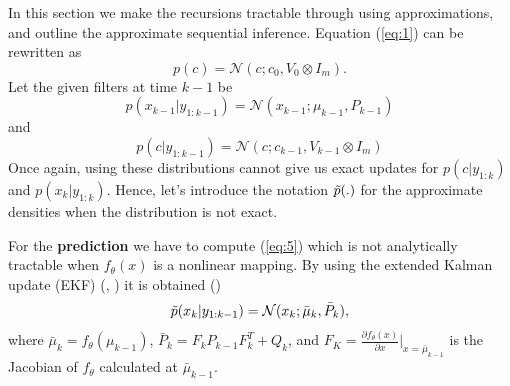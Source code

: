 \documentclass{mldsmsc}
\begin{document}
In this section we make the recursions tractable through using approximations, and outline the approximate sequential inference. Equation (\ref{eq:1}) can be rewritten as 
\begin{equation}
    p(c) = \mathcal{N}(c; c_0, V_0 \otimes I_m).
\end{equation}
Let the given filters at time $k-1$ be 
\begin{equation}
    p(x_{k-1} | y_{1:k-1}) = \mathcal{N}(x_{k-1};\mu_{k-1}, P_{k-1})
\end{equation}
and
\begin{equation}
    p(c | y_{1:k-1}) = \mathcal{N}(c; c_{k-1}, V_{k-1} \otimes I_m)
\end{equation}
Once again, using these distributions cannot give us exact updates for $p(c | y_{1:k})$ and $p(x_k | y_{1:k})$. Hence, let's introduce the notation $\Tilde{p}(.)$ for the approximate densities when the distribution is not exact. \newline

\noindent For the \textbf{prediction} we have to compute (\ref{eq:5}) which is not analytically tractable when $f_{\theta}(x)$ is a nonlinear mapping. By using the extended Kalman update (EKF) (\cite{mclean1962optimal}, \cite{anderson1979optimal}) it is obtained (\cite{akyildiz2021probabilistic})
\begin{equation}
    \Tilde{p}(x_k | y_{1:k-1}) = \mathcal{N}(x_k; \bar{\mu}_k, \bar{P}_k), 
\end{equation}
where $\bar{\mu}_k = f_{\theta}(\mu_{k-1})$, $\bar{P}_k = F_k P_{k-1} F^{T}_{k} + Q_k$, and $F_K = \frac{\partial f_{\theta}(x)}{\partial x} \vert_{x = \bar{\mu}_{k-1}}$ is the Jacobian of $f_{\theta}$ calculated at $\bar{\mu}_{k-1}$. \newline
\end{document}
